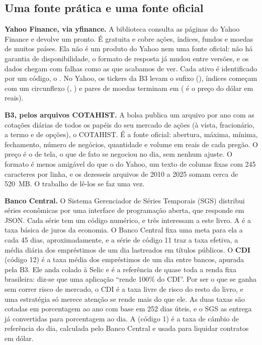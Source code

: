 \subsection{Uma fonte prática e uma fonte oficial}

\textbf{Yahoo Finance, via yfinance.} A biblioteca  consulta as páginas do Yahoo Finance e devolve um  pronto. É gratuita e cobre ações, índices, fundos e moedas de muitos países. Ela não é um produto do Yahoo nem uma fonte oficial: não há garantia de disponibilidade, o formato de resposta já mudou entre versões, e os dados chegam com falhas como as que acabamos de ver. Cada ativo é identificado por um código, o . No Yahoo, os tickers da B3 levam o sufixo  (), índices começam com um circunflexo (, ) e pares de moedas terminam em  ( é o preço do dólar em reais).

\textbf{B3, pelos arquivos COTAHIST.} A bolsa publica um arquivo por ano com as cotações diárias de todos os papéis do seu mercado de ações (à vista, fracionário, a termo e de opções), o COTAHIST. É a fonte oficial: abertura, máxima, mínima, fechamento, número de negócios, quantidade e volume em reais de cada pregão. O preço é o de tela, o que de fato se negociou no dia, sem nenhum ajuste. O formato é menos amigável do que o do Yahoo, um texto de colunas fixas com 245 caracteres por linha, e os dezesseis arquivos de 2010 a 2025 somam cerca de 520~MB. O trabalho de lê-los se faz uma vez.

\textbf{Banco Central.} O Sistema Gerenciador de Séries Temporais (SGS) distribui séries econômicas por uma interface de programação aberta, que responde em JSON. Cada série tem um código numérico, e três interessam a este livro. A  é a taxa básica de juros da economia. O Banco Central fixa uma meta para ela a cada 45 dias, aproximadamente, e a série de código 11 traz a taxa efetiva, a média diária dos empréstimos de um dia lastreados em títulos públicos. O \textbf{CDI} (código 12) é a taxa média dos empréstimos de um dia entre bancos, apurada pela B3. Ele anda colado à Selic e é a referência de quase toda a renda fixa brasileira: diz-se que uma aplicação ``rende 100\% do CDI''. Por ser o que se ganha sem correr risco de mercado, o CDI é a taxa livre de risco do resto do livro, e uma estratégia só merece atenção se rende mais do que ele. As duas taxas são cotadas em porcentagem ao ano com base em 252 dias úteis, e o SGS as entrega já convertidas para porcentagem ao dia. A  (código 1) é a taxa de câmbio de referência do dia, calculada pelo Banco Central e usada para liquidar contratos em dólar.


